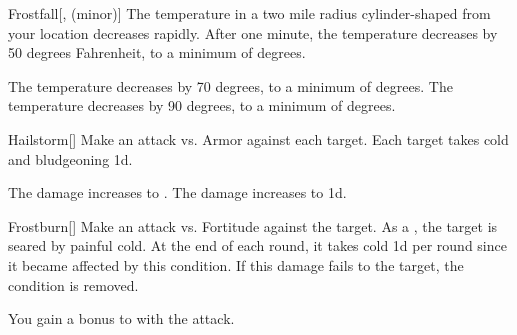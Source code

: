 \lowercase{\hypertarget{spell:Frostfall}{}}\label{spell:Frostfall}
\begin{freeability}[Rank 4]{\hypertarget{spell:Frostfall}{Frostfall}}[,  (minor)]
\targetrule
The temperature in a two mile radius cylinder-shaped  from your location decreases rapidly.
After one minute, the temperature decreases by 50 degrees Fahrenheit, to a minimum of  degrees.

\rankline
{} The temperature decreases by 70 degrees, to a minimum of  degrees.
 The temperature decreases by 90 degrees, to a minimum of  degrees.
\end{freeability}
\vspace{0.25em}



\lowercase{\hypertarget{spell:Hailstorm}{}}\label{spell:Hailstorm}
\begin{freeability}[Rank 4]{\hypertarget{spell:Hailstorm}{Hailstorm}}[]
Make an attack vs. Armor against each target.
\hit Each target takes cold and bludgeoning  \minus1d.

\rankline
{} The damage increases to .
 The damage increases to  \plus1d.
\end{freeability}
\vspace{0.25em}



\lowercase{\hypertarget{spell:Frostburn}{}}\label{spell:Frostburn}
\begin{freeability}[Rank 6]{\hypertarget{spell:Frostburn}{Frostburn}}[]
Make an attack vs. Fortitude against the target.
\hit As a , the target is seared by painful cold.
At the end of each round, it takes cold  \minus1d per round since it became affected by this condition.
If this damage fails to  the target, the condition is removed.

 You gain a  bonus to  with the attack.
\end{freeability}
\vspace{0.25em}



